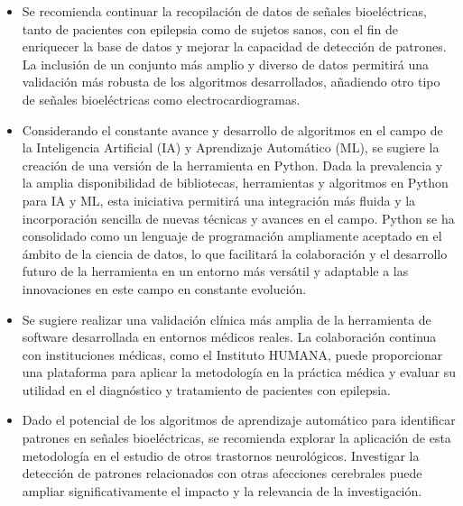 \begin{itemize}
    \item Se recomienda continuar la recopilación de datos de señales bioeléctricas, tanto de pacientes con epilepsia como de sujetos sanos, con el fin de enriquecer la base de datos y mejorar la capacidad de detección de patrones. La inclusión de un conjunto más amplio y diverso de datos permitirá una validación más robusta de los algoritmos desarrollados, añadiendo otro tipo de señales bioeléctricas como electrocardiogramas.
    
    \item Considerando el constante avance y desarrollo de algoritmos en el campo de la Inteligencia Artificial (IA) y Aprendizaje Automático (ML), se sugiere la creación de una versión de la herramienta en Python. Dada la prevalencia y la amplia disponibilidad de bibliotecas, herramientas y algoritmos en Python para IA y ML, esta iniciativa permitirá una integración más fluida y la incorporación sencilla de nuevas técnicas y avances en el campo. Python se ha consolidado como un lenguaje de programación ampliamente aceptado en el ámbito de la ciencia de datos, lo que facilitará la colaboración y el desarrollo futuro de la herramienta en un entorno más versátil y adaptable a las innovaciones en este campo en constante evolución.

    \item Se sugiere realizar una validación clínica más amplia de la herramienta de software desarrollada en entornos médicos reales. La colaboración continua con instituciones médicas, como el Instituto HUMANA, puede proporcionar una plataforma para aplicar la metodología en la práctica médica y evaluar su utilidad en el diagnóstico y tratamiento de pacientes con epilepsia.

    \item Dado el potencial de los algoritmos de aprendizaje automático para identificar patrones en señales bioeléctricas, se recomienda explorar la aplicación de esta metodología en el estudio de otros trastornos neurológicos. Investigar la detección de patrones relacionados con otras afecciones cerebrales puede ampliar significativamente el impacto y la relevancia de la investigación.
    

    
\end{itemize}